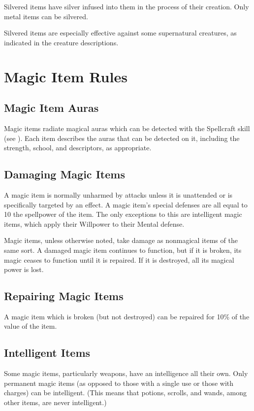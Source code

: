 Silvered items have silver infused into them in the process of their creation.
Only metal items can be silvered.

Silvered items are especially effective against some supernatural creatures, as indicated in the creature descriptions.

\section{Magic Item Rules}

\subsection{Magic Item Auras}

Magic items radiate magical auras which can be detected with the Spellcraft skill (see ).
Each item describes the auras that can be detected on it, including the strength, school, and descriptors, as appropriate.

\subsection{Damaging Magic Items}

A magic item is normally unharmed by attacks unless it is unattended or is specifically targeted by an effect.
A magic item's special defenses are all equal to 10 \add the spellpower of the item.
The only exceptions to this are intelligent magic items, which apply their Willpower to their Mental defense.

Magic items, unless otherwise noted, take damage as nonmagical items of the same sort.
A damaged magic item continues to function, but if it is broken, its magic ceases to function until it is repaired.
If it is destroyed, all its magical power is lost.

\subsection{Repairing Magic Items}

A magic item which is broken (but not destroyed) can be repaired for 10\% of the value of the item.

\subsection{Intelligent Items}

Some magic items, particularly weapons, have an intelligence all their own.
Only permanent magic items (as opposed to those with a single use or those with charges) can be intelligent.
(This means that potions, scrolls, and wands, among other items, are never intelligent.)


